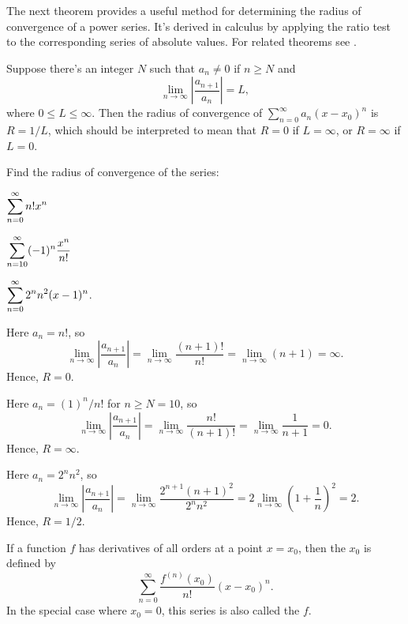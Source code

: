 The next theorem provides a useful method for determining the
radius of convergence of a power series. It's derived in calculus by
applying the ratio test to the corresponding series of absolute
values. For related theorems see .

\begin{theorem}\label{thmtype:7.1.3}
Suppose there's an integer $N$ such that $a_n\ne0$ if
$n\ge N$ and
\[
\lim_{n\to\infty}\left|\frac{a_{n+1}}{a_n}\right|=L,
\]
where $0\le L\le\infty$. Then the radius of
convergence
of $\sum_{n=0}^\infty a_n(x-x_0)^n$ is $R=1/ L$, which should be interpreted
to mean that $R=0$ if $L=\infty$, or $R=\infty$ if $L=0$.
\end{theorem}

\begin{example} \label{example:7.1.1}
Find the radius of convergence of the series:
\begin{enumext*}[label=\alph*,wrap-label={(#1)},columns=3,labelwidth=2em,list-offset=5em]
\item$\displaystyle\sum_{n=0}^\infty n!x^n$
\item$\displaystyle\sum_{n=10}^\infty (-1)^n \frac{x^n}{n!}$
\item$\displaystyle\sum_{n=0}^\infty 2^nn^2 (x-1)^n$.
\end{enumext*}
\end{example}

\begin{alistSolution}
\item Here $a_n=n!$, so
\[
\lim_{n\to\infty}\left|\frac{a_{n+1}}{a_n}\right|=\lim_{n\to\infty}
\frac{(n+1)!}{n!}=\lim_{n\to\infty}(n+1)=\infty.
\]
Hence, $R=0$.

\item Here $a_n=(1)^n/n!$ for $n\ge N=10$, so
\[
\lim_{n\to\infty}\left|\frac{a_{n+1}}{a_n}\right|=\lim_{n\to\infty}
\frac{n!}{(n+1)!}=\lim_{n\to\infty}\frac{1}{n+1}=0.
\]
Hence, $R=\infty$.

\item Here $a_n=2^nn^2$, so
\[
\lim_{n\to\infty}\left|\frac{a_{n+1}}{a_n}\right|=\lim_{n\to\infty}
\frac{2^{n+1}(n+1)^2}{2^nn^2}=2\lim_{n\to\infty}\left(1+\frac{1}{n}\right)^2=2.
\]
Hence, $R=1/2$.
\end{alistSolution}


If a function $f$ has derivatives of all orders at a point $x=x_0$,
then the
 $x_0$  is
defined by
\[
 \sum_{n=0}^\infty\frac{f^{(n)}(x_0)}{n!}(x-x_0)^n.
\]
In the special case where $x_0=0$, this series is also called the
 $f$.

